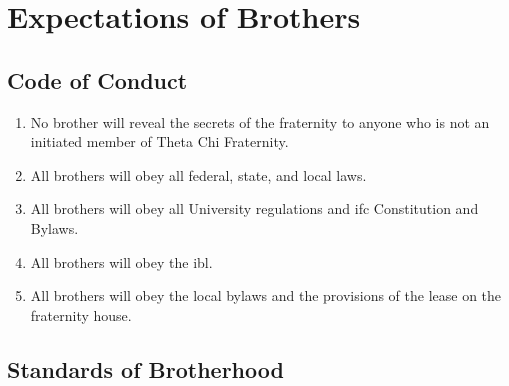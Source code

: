 \chapter{Expectations of Brothers}
\label{expectations-bhood}

\section{Code of Conduct}
	\begin{enumerate}
		\item No brother will reveal the secrets of the fraternity to anyone who is not an initiated member of Theta Chi Fraternity.
		\item All brothers will obey all federal, state, and local laws.
		\item All brothers will obey all University regulations and \gls{ifc} Constitution and Bylaws.
		\item All brothers will obey the \gls{ibl}.
		\item All brothers will obey the local bylaws and the provisions of the lease on the fraternity house.

	\end{enumerate}

\section{Standards of Brotherhood}

